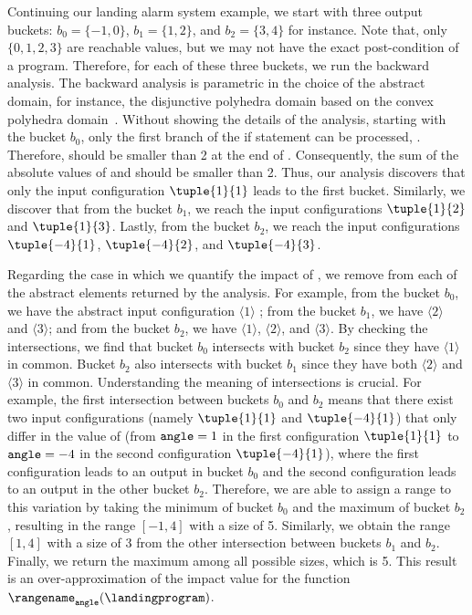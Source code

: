 Continuing our landing alarm system example, we start with three output buckets: $b_0=\{-1, 0\}$, $b_1=\{1, 2\}$, and $b_2=\{3, 4\}$ for instance.
Note that, only $\{0, 1, 2, 3\}$ are reachable \z{} values, but we may not have the exact post-condition of a program.
Therefore, for each of these three buckets, we run the backward analysis.
The backward analysis is parametric in the choice of the abstract domain, for instance, the disjunctive polyhedra domain based on the convex polyhedra domain~.
Without showing the details of the analysis, starting with the bucket $b_0$, only the first branch of the if statement can be processed, .
Therefore, \lc{} should be smaller than 2 at the end of .
Consequently, the sum of the absolute values of \x{} and \y{} should be smaller than 2.
Thus, our analysis discovers that only the input configuration $\tuple{1}{1}$ leads to the first bucket.
Similarly, we discover that from the bucket $b_1$, we reach the input configurations $\tuple{1}{2}$ and $\tuple{1}{3}$.
Lastly, from the bucket $b_2$, we reach the input configurations $\tuple{-4}{1}$, $\tuple{-4}{2}$, and $\tuple{-4}{3}$.

Regarding the case in which we quantify the impact of \x{}, we remove \x{} from each of the abstract elements returned by the analysis.
For example, from the bucket $b_0$, we have the abstract input configuration $\langle 1\rangle$
; from the bucket $b_1$, we have $\langle 2\rangle$ and $\langle 3\rangle$; and from the bucket $b_2$, we have $\langle 1\rangle$, $\langle 2\rangle$, and $\langle 3\rangle$.
By checking the intersections, we find that bucket $b_0$ intersects with bucket $b_2$ since they have $\langle 1\rangle$ in common.
Bucket $b_2$ also intersects with bucket $b_1$ since they have both $\langle 2\rangle$ and $\langle 3\rangle$ in common.
Understanding the meaning of intersections is crucial.
For example, the first intersection between buckets $b_0$ and $b_2$ means that there exist two input configurations (namely $\tuple{1}{1}$ and $\tuple{-4}{1}$) that only differ in the value of \x{} (from $\texttt{angle}=1$ in the first configuration $\tuple{1}{1}$ to $\texttt{angle}=-4$ in the second configuration $\tuple{-4}{1}$), where the first configuration leads to an output in bucket $b_0$ and the second configuration leads to an output in the other bucket $b_2$.
Therefore, we are able to assign a range to this variation by taking the minimum of bucket $b_0$ and the maximum of bucket $b_2$, resulting in the range $[-1,4]$ with a size of 5.
Similarly, we obtain the range $[1,4]$ with a size of 3 from the other intersection between buckets $b_1$ and $b_2$.
Finally, we return the maximum among all possible sizes, which is 5.
This result is an over-approximation of the impact value for the function $\rangename_\x(\landingprogram)$.

